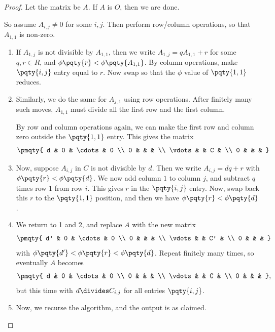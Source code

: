 \begin{proof}
    Let the matrix be \(A\). If \(A\) is \(O\), then we are done.

    So assume \(A_{i, j} \neq 0\) for some \(i, j\). Then perform row/column operations, so that \(A_{1, 1}\) is non-zero.

    \begin{enumerate}
        \item If \(A_{1, j}\) is not divisible by \(A_{1, 1}\), then we write \(A_{1, j} = q A_{1, 1} + r\) for some \(q, r \in R\), and \(\phi\pqty{r} < \phi\pqty{A_{1, 1}}\). By column operations, make \(\pqty{i, j}\) entry equal to \(r\). Now swap so that the \(\phi\) value of \(\pqty{1, 1}\) reduces.

        \item Similarly, we do the same for \(A_{j, 1}\) using row operations. After finitely many such moves, \(A_{1, 1}\) must divide all the first row and the first column.

        By row and column operations again, we can make the first row and column zero outside the \(\pqty{1, 1}\) entry. This gives the matrix
        \[
            \pmqty{
                d & 0 & \cdots & 0 \\
                0 & & & \\
                \vdots & & C & \\
                0 & & &
            }
        \]

        \item Now, suppose \(A_{i, j}\) in \(C\) is not divisible by \(d\). Then we write \(A_{i, j} = dq + r\) with \(\phi\pqty{r} < \phi\pqty{d}\). We now add column \(1\) to column \(j\), and subtract \(q\) times row \(1\) from row \(i\). This gives \(r\) in the \(\pqty{i, j}\) entry. Now, swap back this \(r\) to the \(\pqty{1, 1}\) position, and then we have \(\phi\pqty{r} < \phi\pqty{d}\).

        \item We return to 1 and 2, and replace \(A\) with the new matrix
        \[
            \pmqty{
                d' & 0 & \cdots & 0 \\
                0 & & & \\
                \vdots & & C' & \\
                0 & & &
            }
        \]
        with \(\phi\pqty{d'} < \phi\pqty{r} < \phi\pqty{d}\). Repeat finitely many times, so eventually \(A\) becomes
        \[
            \pmqty{
                d & 0 & \cdots & 0 \\
                0 & & & \\
                \vdots & & C & \\
                0 & & &
            },
        \]
        but this time with \(d \divides C_{i, j}\) for all entries \(\pqty{i, j}\).

        \item Now, we recurse the algorithm, and the output is as claimed.
    \end{enumerate}
\end{proof}

